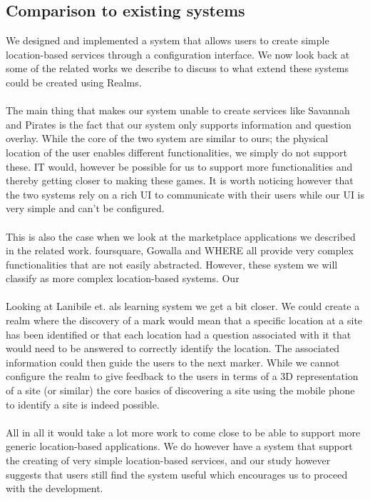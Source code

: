 \subsection{Comparison to existing systems} %
\label{sub:comparison_to_existing_systems}
We designed and implemented a system that allows users to create simple location-based services through a configuration interface. We now look back at some of the related works we describe to discuss to what extend these systems could be created using Realms.
\\\\
The main thing that makes our system unable to create services like Savannah \cite{Benford_Rowland_Hull_Reid_Morrison_Facer_Clayton_2004} and Pirates \cite{Falk:2001:PPI:634067.634140} is the fact that our system only supports information and question overlay. While the core of the two system are similar to ours; the physical location of the user enables different functionalities, we simply do not support these. IT would, however be possible for us to support more functionalities and thereby getting closer to making these games. It is worth noticing however that the two systems rely on a rich UI to communicate with their users while our UI is very simple and can't be configured.
\\\\
This is also the case when we look at the marketplace applications we described in the related work. foursquare, Gowalla and WHERE all provide very complex functionalities that are not easily abstracted. However, these system we will classify as more complex location-based systems. Our 
\\\\
Looking at Lanibile et. als learning system \cite{4351331} we get a bit closer. We could create a realm where the discovery of a mark would mean that a specific location at a site has been identified or that each location had a question associated with it that would need to be answered to correctly identify the location. The associated information could then guide the users to the next marker. While we cannot configure the realm to give feedback to the users in terms of a 3D representation of a site (or similar) the core basics of discovering a site using the mobile phone to identify a site is indeed possible.
\\\\
All in all it would take a lot more work to come close to be able to support more generic location-based applications. We do however have a system that support the creating of very simple location-based services, and our study however suggests that users still find the system useful which encourages us to proceed with the development.
